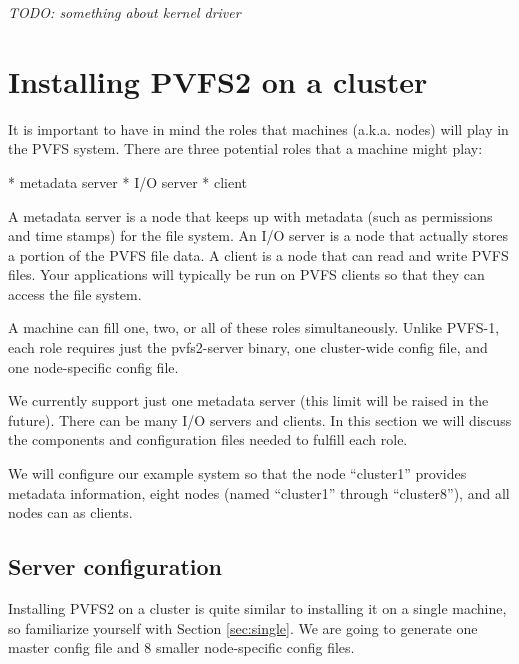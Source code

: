 \documentclass[11pt, letterpaper]{article}
\begin{document}
\emph{TODO: something about kernel driver}


\section{Installing PVFS2 on a cluster}
\label{sec:cluster}
It is important to have in mind the roles that machines (a.k.a. nodes) will
play in the PVFS system. There are three potential roles that a machine might
play:

    * metadata server
    * I/O server
    * client

A metadata server is a node that keeps up with metadata (such as permissions
and time stamps) for the file system. An I/O server is a node that actually
stores a portion of the PVFS file data. A client is a node that can read and
write PVFS files. Your applications will typically be run on PVFS clients so
that they can access the file system.

A machine can fill one, two, or all of these roles simultaneously. Unlike
PVFS-1, each role requires just the pvfs2-server binary, one cluster-wide
config file, and one node-specific config file.

We currently support just one metadata server (this limit will be raised in the
future).  There can be many I/O servers and clients. In this section we will
discuss the components and configuration files needed to fulfill each role.

We will configure our example system so that the node ``cluster1'' provides
metadata information, eight nodes (named ``cluster1'' through ``cluster8''),
and all nodes can as clients.

\subsection{Server configuration}

Installing PVFS2 on a cluster is quite similar to installing it on a single
machine, so familiarize yourself with Section \ref{sec:single}.  We are going
to generate one master config file and 8 smaller node-specific config files. 
\end{document}
